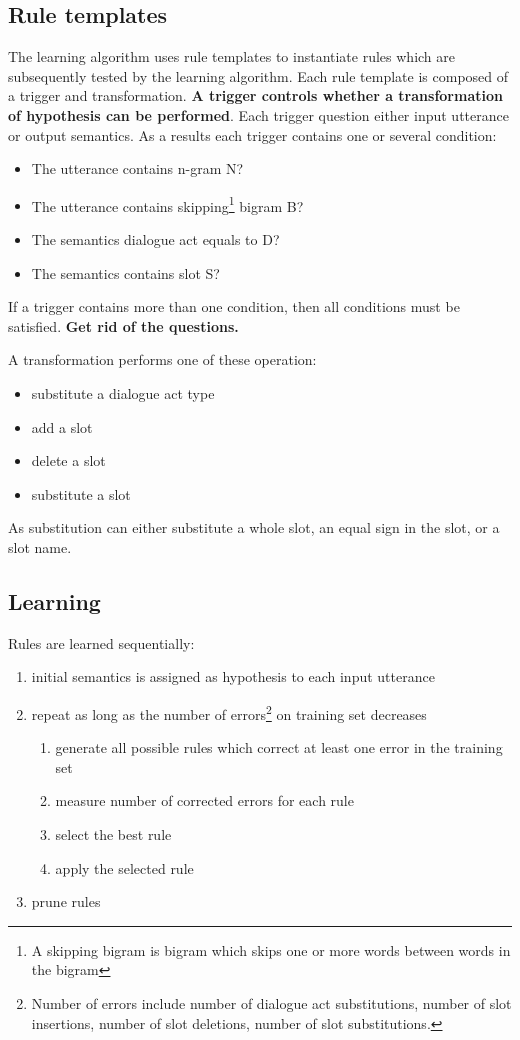 \documentclass[11pt]{article}
\begin{document}
\subsection{Rule templates}
The learning algorithm uses rule templates to instantiate rules which are subsequently tested by the learning algorithm. Each rule template is composed of a trigger and transformation. \textbf{A trigger controls whether a transformation of hypothesis can be performed}. Each trigger question either input utterance or output semantics. As a results each trigger contains one or several condition:
\begin{itemize}
  \item The utterance contains n-gram N?
  \item The utterance contains skipping\footnote{A skipping bigram is bigram which skips one or more words between words in the bigram} bigram B?
  \item The semantics dialogue act equals to D?
  \item The semantics contains slot S?
\end{itemize}
If a trigger contains more than one condition, then all conditions must be satisfied. \textbf{Get rid of the questions.}

A transformation performs one of these operation:
\begin{itemize}
  \item substitute a dialogue act type
  \item add a slot
  \item delete a slot
  \item substitute a slot
\end{itemize}
As substitution can either substitute a whole slot, an equal sign in the slot, or a slot name.


\subsection{Learning}

Rules are learned sequentially:
\begin{enumerate}
  \item initial semantics is assigned as hypothesis to each input utterance
  \item repeat as long as the number of errors\footnote{Number of errors include number of dialogue act substitutions, number of slot insertions, number of slot deletions, number of slot substitutions.} on training set decreases
  \begin{enumerate}
    \item generate all possible rules which correct at least one error in the training set
    \item measure number of corrected errors for each rule
    \item select the best rule
    \item apply the selected rule
  \end{enumerate}
  \item prune rules
\end{enumerate}
\end{document}
